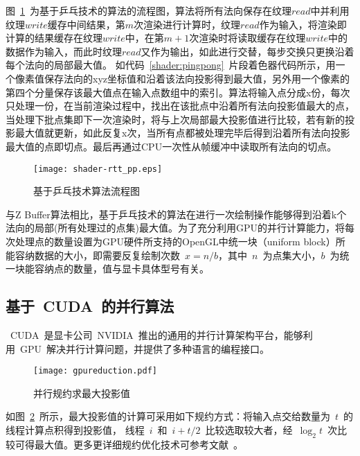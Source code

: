 图~\ref{fig:shader-rtt-pingpong-flowchart}~为基于乒乓技术的算法的流程图，算法将所有法向保存在纹理$read$中并利用纹理$write$缓存中间结果，第$m$次渲染进行计算时，纹理$read$作为输入，将渲染即计算的结果缓存在纹理$write$中，在第$m+1$次渲染时将读取缓存在纹理$write$中的数据作为输入，而此时纹理$read$又作为输出，如此进行交替，每步交换只更换沿着每个法向的局部最大值。
如代码~\ref{shader:pingpong}~片段着色器代码所示，用一个像素值保存法向的xyz坐标值和沿着该法向投影得到最大值，另外用一个像素的第四个分量保存该最大值点在输入点数组中的索引。算法将输入点分成x份，每次只处理一份，在当前渲染过程中，找出在该批点中沿着所有法向投影值最大的点，当处理下批点集即下一次渲染时，将与上次局部最大投影值进行比较，若有新的投影最大值就更新，如此反复x次，当所有点都被处理完毕后得到沿着所有法向投影最大值的点即切点。最后再通过CPU一次性从帧缓冲中读取所有法向的切点。

\begin{figure}[htbp]
  \centering
  \texttt{[image: shader-rtt\_pp.eps]}
  \caption{基于乒乓技术算法流程图}
  \label{fig:shader-rtt-pingpong-flowchart}
\end{figure}



与Z Buffer算法相比，基于乒乓技术的算法在进行一次绘制操作能够得到沿着k个法向的局部(所有处理过的点集)最大值。为了充分利用GPU的并行计算能力，将每次处理点的数量设置为GPU硬件所支持的OpenGL中统一块（uniform
block）所能容纳数据的大小，即需要反复绘制次数~$x=n/b$，其中~$n$~为点集大小，$b$~为统一块能容纳点的数量，值与显卡具体型号有关。 

\subsection{基于~CUDA~的并行算法}
\label{subsec:determ-normals-by-cuda}

~CUDA~是显卡公司~NVIDIA~推出的通用的并行计算架构平台，能够利用~GPU~解决并行计算问题，并提供了多种语言的编程接口。
\begin{figure}[htbp] %
\centering
\texttt{[image: gpureduction.pdf]}
\caption{并行规约求最大投影值}
\label{lbl:reduction-getmax}
\end{figure}
如图~\ref{lbl:reduction-getmax}~所示，最大投影值的计算可采用如下规约方式：将输入点交给数量为~$t$~的线程计算点积得到投影值，
线程~$i$~和~$i+t/2$~比较选取较大者，经~$\log_2t$~次比较可得最大值。更多更详细规约优化技术可参考文献~。

